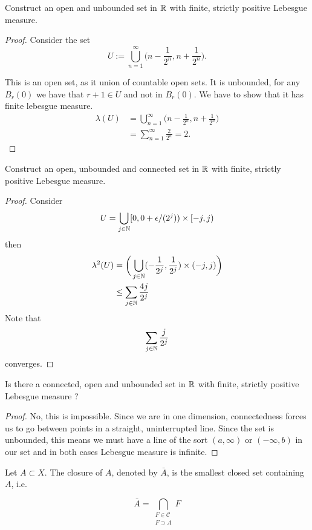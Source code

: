 \begin{thm}[Problem 6.6a]
Construct an open and unbounded set in \(\Bbb{R}\) with finite, strictly positive Lebesgue measure.
\end{thm}

\begin{proof}
Consider the set
\[
U:=\bigcup _{n=1}^\infty  \bigg(n-\frac{1}{2^n},n+\frac{1}{2^n}\bigg).
\]

This is an open set, as it union of countable open sets. It is unbounded, for any \(B_{r}(0)\) we have that $r+1\in U$ and not in \(B_{r}(0)\). We have to show that it has finite lebesgue measure.
\begin{align*}
\lambda (U)&=\bigcup _{n=1}^\infty  \bigg(n-\frac{1}{2^n},n+\frac{1}{2^n}\bigg)\\
&=\sum _{n=1}^\infty \frac{2}{2^n}=2.
\end{align*}
\end{proof}

\begin{thm}[Problem 6.6ii]
Construct an open, unbounded and connected set in \(\Bbb{R}\) with finite, strictly positive Lebesgue measure.
\end{thm}

\begin{proof}
Consider
\[
U=\bigcup _{j\in \Bbb{N}}[0,0+\epsilon/(2^j))\times[-j,j)
\]
then \begin{align*}
\lambda ^2(U)&=\bigg(\bigcup _{j\in \Bbb{N}}(-\frac{1}{2^j},\frac{1}{2^j})\times(-j,j) \bigg)\\
&\leq \sum _{j\in \Bbb{N}}\frac{4j}{2^j}
\end{align*}
Note that
\[
\sum _{j\in \Bbb{N}}\frac{j}{2^j}
\]
converges.
\end{proof}

\begin{thm}
Is there a connected, open and unbounded set in \(\Bbb{R}\) with finite, strictly positive Lebesgue measure ?
\end{thm}


\begin{proof}
No, this is impossible. Since we are in one dimension, connectedness forces us to go between points in a straight, uninterrupted line. Since the set is unbounded, this means we must have a line of the sort \((a,\infty )\) or \((-\infty ,b)\) in our set and in both cases Lebesgue measure is infinite.
\end{proof}

\begin{defn}
Let \(A \subset  X\). The closure of \(A\), denoted by \(\bar{A}\), is the smallest closed set
containing \(A\), i.e.

\[
\bar{A}=\bigcap_{\substack{F\in \mathcal{C}\\F\supset A}} F
\]

\end{defn}

